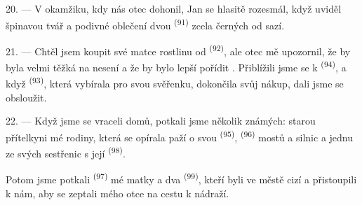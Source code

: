 \VUsaut{3.0mm}

20. --- V okamžiku, kdy nás otec dohonil, Jan se hlasitě rozesmál, když uviděl špinavou tvář a
podivné oblečení dvou  \textsuperscript{(91)} zcela černých od sazí.

21. --- Chtěl jsem koupit své matce rostlinu od  \textsuperscript{(92)},
ale otec mě upozornil, že by byla velmi těžká na nesení a že by bylo lepší pořídit
. Přiblížili jsme se k  \textsuperscript{(94)}, a když
 \textsuperscript{(93)}, která vybírala pro svou svěřenku, dokončila svůj
nákup, dali jsme se obsloužit.

22. --- Když jsme se vraceli domů, potkali jsme několik známých: starou přítelkyni mé rodiny,
která se opírala paží o svou  \textsuperscript{(95)},
 \textsuperscript{(96)} mostů a silnic a jednu ze svých sestřenic s
její  \textsuperscript{(98)}.

Potom jsme potkali  \textsuperscript{(97)} mé matky a dva
 \textsuperscript{(99)}, kteří byli ve městě cizí a přistoupili k nám,
aby se zeptali mého otce na cestu k nádraží.
